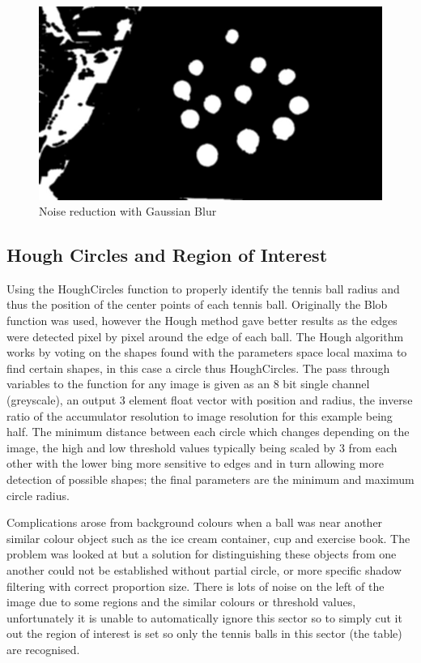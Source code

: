 \documentclass[a4paper, 10pt]{article}
\begin{document}
\begin{figure}[H]
  \includegraphics[width=\linewidth]{images/Blur}
  \caption{Noise reduction with Gaussian Blur}
  \label{fig:Noise reduction with Gaussian Blur}
\end{figure}

\clearpage
\subsection{Hough Circles and Region of Interest}

Using the HoughCircles function to properly identify the tennis ball radius and thus the position of the center points of each tennis ball. Originally the Blob function was used, however the Hough method gave better results as the edges were detected pixel by pixel around the edge of each ball. The Hough algorithm works by voting on the shapes found with the parameters space local maxima to find certain shapes, in this case a circle thus HoughCircles. The pass through variables to the function for any image is given as an 8 bit single channel (greyscale), an output 3 element float vector with position and radius, the inverse ratio of the accumulator resolution to image resolution for this example being half. The minimum distance between each circle which changes depending on the image, the high and low threshold values typically being scaled by 3 from each other with the lower bing more sensitive to edges and in turn allowing more detection of possible shapes; the final parameters are the minimum and maximum circle radius.

Complications arose from background colours when a ball was near another similar colour object such as the ice cream container, cup and exercise book. The problem was looked at but a solution for distinguishing these objects from one another could not be established without partial circle, or more specific shadow filtering with correct proportion size. There is lots of noise on the left of the image due to some regions and the similar colours or threshold values, unfortunately it is unable to automatically ignore this sector so to simply cut it out the region of interest is set so only the tennis balls in this sector (the table) are recognised. 
\end{document}
